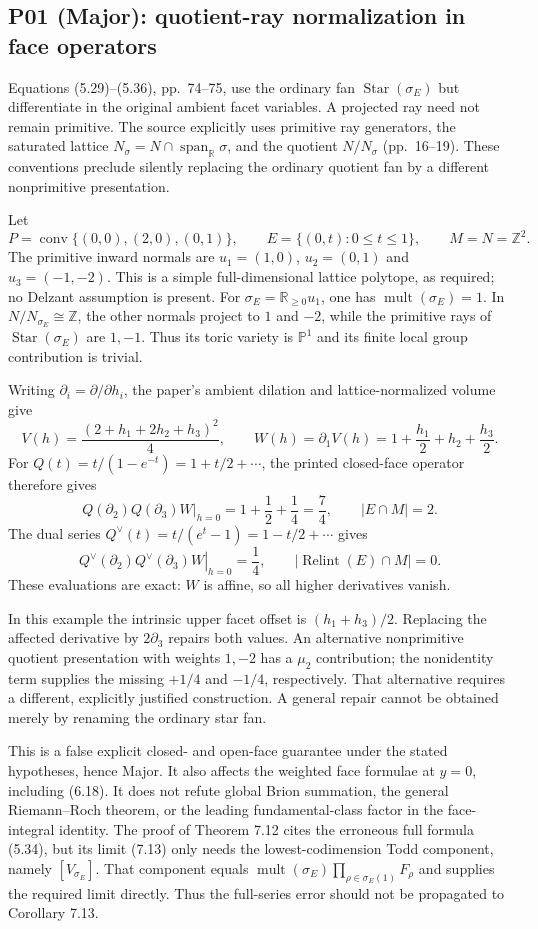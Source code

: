 \documentclass[10pt]{article}
\begin{document}
\subsection*{P01 (Major): quotient-ray normalization in face operators}
Equations (5.29)–(5.36), pp. 74–75, use the ordinary fan \(\operatorname{Star}(\sigma_E)\) but differentiate in the original ambient facet variables. A projected ray need not remain primitive. The source explicitly uses primitive ray generators, the saturated lattice \(N_\sigma=N\cap\operatorname{span}_{\mathbb R}\sigma\), and the quotient \(N/N_\sigma\) (pp. 16–19). These conventions preclude silently replacing the ordinary quotient fan by a different nonprimitive presentation.\par
Let \[P=\operatorname{conv}\{(0,0),(2,0),(0,1)\},\qquad
 E=\{(0,t):0\leq t\leq1\},\qquad M=N=\mathbb Z^2.\] The primitive inward normals are \(u_1=(1,0)\), \(u_2=(0,1)\) and \(u_3=(-1,-2)\). This is a simple full-dimensional lattice polytope, as required; no Delzant assumption is present. For \(\sigma_E=\mathbb R_{\geq0}u_1\), one has \(\operatorname{mult}(\sigma_E)=1\). In \(N/N_{\sigma_E}\cong\mathbb Z\), the other normals project to \(1\) and \(-2\), while the primitive rays of \(\operatorname{Star}(\sigma_E)\) are \(1,-1\). Thus its toric variety is \(\mathbb P^1\) and its finite local group contribution is trivial.\par
Writing \(\partial_i=\partial/\partial h_i\), the paper’s ambient dilation and lattice-normalized volume give \[V(h)=\frac{(2+h_1+2h_2+h_3)^2}{4},\qquad
 W(h)=\partial_1V(h)=1+\frac{h_1}{2}+h_2+\frac{h_3}{2}.\] For \(Q(t)=t/(1-e^{-t})=1+t/2+\cdots\), the printed closed-face operator therefore gives \[\left.Q(\partial_2)Q(\partial_3)W\right|_{h=0}
 =1+\frac12+\frac14=\frac74,
 \qquad |E\cap M|=2.\] The dual series \(Q^\vee(t)=t/(e^t-1)=1-t/2+\cdots\) gives \[\left.Q^\vee(\partial_2)Q^\vee(\partial_3)W\right|_{h=0}
 =\frac14,\qquad |\operatorname{Relint}(E)\cap M|=0.\] These evaluations are exact: \(W\) is affine, so all higher derivatives vanish.\par
In this example the intrinsic upper facet offset is \((h_1+h_3)/2\). Replacing the affected derivative by \(2\partial_3\) repairs both values. An alternative nonprimitive quotient presentation with weights \(1,-2\) has a \(\mu_2\) contribution; the nonidentity term supplies the missing \(+1/4\) and \(-1/4\), respectively. That alternative requires a different, explicitly justified construction. A general repair cannot be obtained merely by renaming the ordinary star fan.\par
This is a false explicit closed- and open-face guarantee under the stated hypotheses, hence Major. It also affects the weighted face formulae at \(y=0\), including (6.18). It does not refute global Brion summation, the general Riemann–Roch theorem, or the leading fundamental-class factor in the face-integral identity. The proof of Theorem 7.12 cites the erroneous full formula (5.34), but its limit (7.13) only needs the lowest-codimension Todd component, namely \([V_{\sigma_E}]\). That component equals \(\operatorname{mult}(\sigma_E)\prod_{\rho\in\sigma_E(1)}F_\rho\) and supplies the required limit directly. Thus the full-series error should not be propagated to Corollary 7.13.\par
\end{document}
